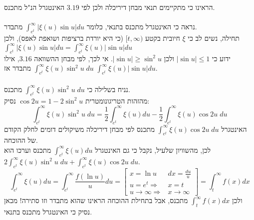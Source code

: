 \documentclass{article}
\begin{document}
הראינו כי מתקיימים תנאי מבחן דיריכלה ולכן לפי $3.19$ האינטגרל הנ"ל מתכנס.
\\\\
נראה כי האינטגרל מתכנס בתנאי, כלומר $\int_{e^t}^\infty |\xi(u)\sin u| du$ מתבדר. \\
תחילה, נשים לב כי $\xi$ חיובית בקטע $[t,\infty)$
(כי היא יורדת ברציפות ושואפת לאפס), ולכן $\int_{e^t}^\infty |\xi(u)\sin u| du = \int_{e^t}^\infty \xi(u)|\sin u| du$ \\
ידוע כי $|\sin u|\leq 1$ ולכן $|\sin u| \geq \sin^2u$.
אי לכך, לפי מבחן ההשוואה $3.16$, אילו $\int_{e^t}^\infty \xi(u)\sin^2 u \; du$ מתבדר
אז $\int_{e^t}^\infty \xi(u)|\sin u| du$.
\\\\
נניח בשלילה כי $\int_{e^t}^\infty \xi(u)\sin^2 u \; du$ מתכנס. \\
מהזהות הטריגונומטרית $\cos 2u = 1 - 2\sin^2u$ נסיק:
\[
    \int_{e^t}^\infty \xi(u)\sin^2 u \; du =
    \frac{1}{2}\int_{e^t}^\infty \xi(u) du - \frac{1}{2} \int_{e^t}^\infty \xi(u)\cos 2u \; du
\]
האינטגרל $\int_{e^t}^\infty \xi(u)\cos 2u \; du$ מתכנס לפי מבחן דיריכלה משיקולים דומים לחלק הקודם של ההוכחה.\\
לכן, מהשוויון שלעיל, נקבל כי גם האינטגרל $\int_{e^t}^\infty \xi(u) du$ מתכנס
וערכו הוא $2\int_{e^t}^\infty \xi(u)\sin^2 u \; du + \int_{e^t}^\infty \xi(u)\cos 2u \; du$.
\[
    \int_{e^t}^\infty \xi(u)du =
    \int_{e^t}^\infty \frac{f(\ln u)}{u} du =
    \begin{bmatrix}
        x = \ln u                       & dx = \frac{du}{u}    \\
        u = e^t \Rightarrow             & x = t                \\
        u\rightarrow \infty \Rightarrow & x \rightarrow \infty
    \end{bmatrix} =
    \int_t^\infty f(x)dx
\]
ולכן $\int_t^\infty f(x)dx$ מתכנס,
אבל בתחילת ההוכחה הראינו שהוא מתבדר וזו סתירה! מכאן נסיק כי האינטגרל מתכנס בתנאי.
\end{document}
